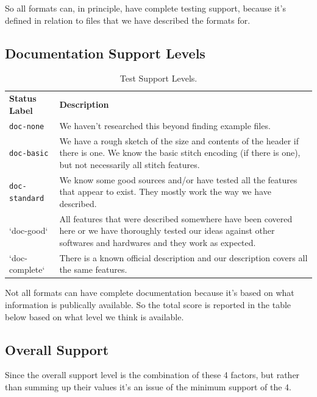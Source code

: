 \documentclass[11pt]{report}
\begin{document}
So all formats can, in principle, have complete testing support, because it's
defined in relation to files that we have described the formats for.

\subsection{Documentation Support Levels}

\begin{longtable}{p{4cm} p{8cm}}
\caption{Test Support Levels.}
\label{tab:doc-support} \\
\textbf{Status Label} &
\textbf{Description} \\

\texttt{doc-none} &
We haven't researched this beyond finding example files. \\

\texttt{doc-basic} &
We have a rough sketch of the size and contents of the header if there is one.
We know the basic stitch encoding (if there is one), but not necessarily all
stitch features. \\

\texttt{doc-standard} &
We know some good sources and/or have tested all the features that appear to
exist. They mostly work the way we have described. \\

`doc-good` &
All features that were described somewhere have been covered here or we have
thoroughly tested our ideas against other softwares and hardwares and they work
as expected. \\

`doc-complete` &
There is a known official description and our description covers all the same
features.
\end{longtable}

Not all formats can have complete documentation because it's based on what
information is publically available. So the total score is reported in the table
below based on what level we think is available.

\subsection{Overall Support}

Since the overall support level is the combination of these
4 factors, but rather than summing up their values it's an
issue of the minimum support of the 4.
\end{document}

